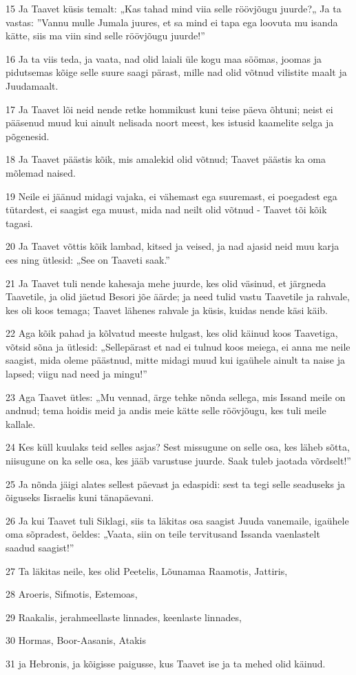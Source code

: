 \par 15 Ja Taavet küsis temalt: „Kas tahad mind viia selle röövjõugu juurde?„ Ja ta vastas: ”Vannu mulle Jumala juures, et sa mind ei tapa ega loovuta mu isanda kätte, siis ma viin sind selle röövjõugu juurde!”
\par 16 Ja ta viis teda, ja vaata, nad olid laiali üle kogu maa söömas, joomas ja pidutsemas kõige selle suure saagi pärast, mille nad olid võtnud vilistite maalt ja Juudamaalt.
\par 17 Ja Taavet lõi neid nende retke hommikust kuni teise päeva õhtuni; neist ei pääsenud muud kui ainult nelisada noort meest, kes istusid kaamelite selga ja põgenesid.
\par 18 Ja Taavet päästis kõik, mis amalekid olid võtnud; Taavet päästis ka oma mõlemad naised.
\par 19 Neile ei jäänud midagi vajaka, ei vähemast ega suuremast, ei poegadest ega tütardest, ei saagist ega muust, mida nad neilt olid võtnud - Taavet tõi kõik tagasi.
\par 20 Ja Taavet võttis kõik lambad, kitsed ja veised, ja nad ajasid neid muu karja ees ning ütlesid: „See on Taaveti saak.”
\par 21 Ja Taavet tuli nende kahesaja mehe juurde, kes olid väsinud, et järgneda Taavetile, ja olid jäetud Besori jõe äärde; ja need tulid vastu Taavetile ja rahvale, kes oli koos temaga; Taavet lähenes rahvale ja küsis, kuidas nende käsi käib.
\par 22 Aga kõik pahad ja kõlvatud meeste hulgast, kes olid käinud koos Taavetiga, võtsid sõna ja ütlesid: „Sellepärast et nad ei tulnud koos meiega, ei anna me neile saagist, mida oleme päästnud, mitte midagi muud kui igaühele ainult ta naise ja lapsed; viigu nad need ja mingu!”
\par 23 Aga Taavet ütles: „Mu vennad, ärge tehke nõnda sellega, mis Issand meile on andnud; tema hoidis meid ja andis meie kätte selle röövjõugu, kes tuli meile kallale.
\par 24 Kes küll kuulaks teid selles asjas? Sest missugune on selle osa, kes läheb sõtta, niisugune on ka selle osa, kes jääb varustuse juurde. Saak tuleb jaotada võrdselt!”
\par 25 Ja nõnda jäigi alates sellest päevast ja edaspidi: sest ta tegi selle seaduseks ja õiguseks Iisraelis kuni tänapäevani.
\par 26 Ja kui Taavet tuli Siklagi, siis ta läkitas osa saagist Juuda vanemaile, igaühele oma sõpradest, öeldes: „Vaata, siin on teile tervitusand Issanda vaenlastelt saadud saagist!”
\par 27 Ta läkitas neile, kes olid Peetelis, Lõunamaa Raamotis, Jattiris,
\par 28 Aroeris, Sifmotis, Estemoas,
\par 29 Raakalis, jerahmeellaste linnades, keenlaste linnades,
\par 30 Hormas, Boor-Aasanis, Atakis
\par 31 ja Hebronis, ja kõigisse paigusse, kus Taavet ise ja ta mehed olid käinud.

